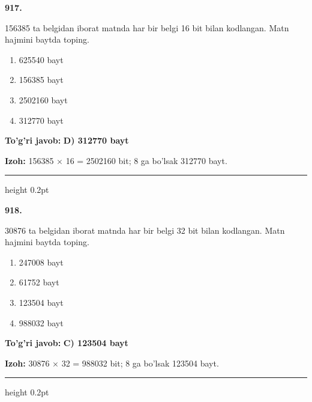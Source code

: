 \documentclass[10pt,a4paper,oneside]{article}
\begin{document}
\noindent\textbf{\color{ink}917.}
\par
156385 ta belgidan iborat matnda har bir belgi 16 bit bilan kodlangan. Matn hajmini baytda toping.
\begin{enumerate}[label=\Alph*),leftmargin=9mm]
\item 625540 bayt
\item 156385 bayt
\item 2502160 bayt
\item 312770 bayt
\end{enumerate}
\begin{tcolorbox}[enhanced,breakable,colback=teal!4,colframe=teal!50!black,boxrule=0.5pt,arc=1.1mm,left=3mm,right=3mm,top=1.7mm,bottom=1.7mm,before skip=2mm,after skip=2mm]
\textbf{\color{teal}To'g'ri javob:} \textbf{D) 312770 bayt}
\par\smallskip
\textbf{Izoh:} 156385 \ensuremath{\times} 16 = 2502160 bit; 8 ga bo'lsak 312770 bayt.
\end{tcolorbox}
\vspace{2mm}\hrule height 0.2pt \vspace{3mm}

\noindent\textbf{\color{ink}918.}
\par
30876 ta belgidan iborat matnda har bir belgi 32 bit bilan kodlangan. Matn hajmini baytda toping.
\begin{enumerate}[label=\Alph*),leftmargin=9mm]
\item 247008 bayt
\item 61752 bayt
\item 123504 bayt
\item 988032 bayt
\end{enumerate}
\begin{tcolorbox}[enhanced,breakable,colback=teal!4,colframe=teal!50!black,boxrule=0.5pt,arc=1.1mm,left=3mm,right=3mm,top=1.7mm,bottom=1.7mm,before skip=2mm,after skip=2mm]
\textbf{\color{teal}To'g'ri javob:} \textbf{C) 123504 bayt}
\par\smallskip
\textbf{Izoh:} 30876 \ensuremath{\times} 32 = 988032 bit; 8 ga bo'lsak 123504 bayt.
\end{tcolorbox}
\vspace{2mm}\hrule height 0.2pt \vspace{3mm}
\end{document}
